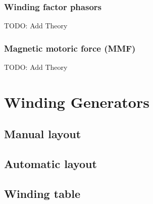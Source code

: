 \documentclass[]{scrreprt}
\begin{document}
\subsubsection{Winding factor phasors}
TODO: Add Theory
%
%
\subsubsection{Magnetic motoric force (MMF)}
TODO: Add Theory






\section{Winding Generators}\label{sec:winding_generators}
\subsection{Manual layout}
\subsection{Automatic layout}
\subsection{Winding table}







\end{document}
